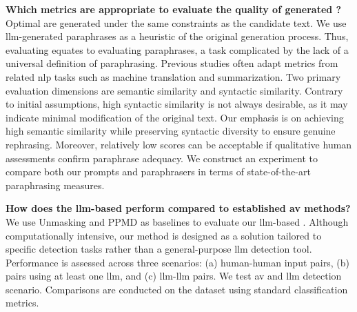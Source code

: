 \begin{questions}
    \item \textbf{Which metrics are appropriate to evaluate the quality of generated \imps{}?} \label{enum:rq2} \hfill \\
    Optimal \imps{} are generated under the same constraints as the candidate text.
    We use \ac{llm}-generated paraphrases as a heuristic of the original generation process.
    Thus, evaluating \imps{} equates to evaluating paraphrases, a task complicated by the lack of a universal definition of paraphrasing.
    Previous studies often adapt metrics from related \ac{nlp} tasks such as machine translation and summarization.
    Two primary evaluation dimensions are semantic similarity and syntactic similarity.
    Contrary to initial assumptions, high syntactic similarity is not always desirable, as it may indicate minimal modification of the original text.
    Our emphasis is on achieving high semantic similarity while preserving syntactic diversity to ensure genuine rephrasing.
    Moreover, relatively low scores can be acceptable if qualitative human assessments confirm paraphrase adequacy.
    We construct an experiment to compare both our prompts and paraphrasers in terms of state-of-the-art paraphrasing measures. 


    \item \textbf{How does the \ac{llm}-based \impAppr{} perform compared to established \ac{av} methods?} \label{enum:rq3} \hfill \\
    We use Unmasking and PPMD as baselines to evaluate our \ac{llm}-based \impAppr{}.
    Although computationally intensive, our method is designed as a solution tailored to specific detection tasks  rather than a general-purpose \ac{llm} detection tool.
    Performance is assessed across three scenarios: (a) human-human input pairs,
    (b) pairs using at least one \ac{llm}, and (c) \ac{llm}-\ac{llm} pairs.
    We test \ac{av} and \ac{llm} detection scenario.
    Comparisons are conducted on the \dataStudent{} dataset using standard classification metrics.
    
\end{questions}


